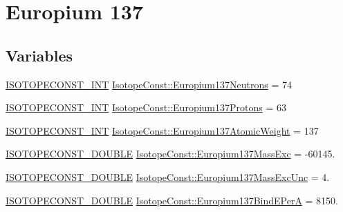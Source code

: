 \hypertarget{group___isotope_const-_europium-_eu137}{}\section{Europium 137}
\label{group___isotope_const-_europium-_eu137}
\subsection*{Variables}
\begin{DoxyCompactItemize}
\item 
\mbox{\hyperlink{group___isotope_const-_macros_ga5f18360b3e99483a35c32d789e62621c}{I\+S\+O\+T\+O\+P\+E\+C\+O\+N\+S\+T\+\_\+\+I\+NT}} \mbox{\hyperlink{group___isotope_const-_europium-_eu137_ga3bf3a65c2ce066a81f9a42bc2dbd182c}{Isotope\+Const\+::\+Europium137\+Neutrons}} = 74
\item 
\mbox{\hyperlink{group___isotope_const-_macros_ga5f18360b3e99483a35c32d789e62621c}{I\+S\+O\+T\+O\+P\+E\+C\+O\+N\+S\+T\+\_\+\+I\+NT}} \mbox{\hyperlink{group___isotope_const-_europium-_eu137_gaedb7fe45412288f79dfe4a004ee0554c}{Isotope\+Const\+::\+Europium137\+Protons}} = 63
\item 
\mbox{\hyperlink{group___isotope_const-_macros_ga5f18360b3e99483a35c32d789e62621c}{I\+S\+O\+T\+O\+P\+E\+C\+O\+N\+S\+T\+\_\+\+I\+NT}} \mbox{\hyperlink{group___isotope_const-_europium-_eu137_gaba948a6826d3500e82c89b603956ab9e}{Isotope\+Const\+::\+Europium137\+Atomic\+Weight}} = 137
\item 
\mbox{\hyperlink{group___isotope_const-_macros_ga8f45a7272ce02c0b4c65c44636ed719a}{I\+S\+O\+T\+O\+P\+E\+C\+O\+N\+S\+T\+\_\+\+D\+O\+U\+B\+LE}} \mbox{\hyperlink{group___isotope_const-_europium-_eu137_ga4af0d256ae4bd2c61c770f03ca2e2f70}{Isotope\+Const\+::\+Europium137\+Mass\+Exc}} = -\/60145.
\item 
\mbox{\hyperlink{group___isotope_const-_macros_ga8f45a7272ce02c0b4c65c44636ed719a}{I\+S\+O\+T\+O\+P\+E\+C\+O\+N\+S\+T\+\_\+\+D\+O\+U\+B\+LE}} \mbox{\hyperlink{group___isotope_const-_europium-_eu137_gaf161e090e45e273acebfafbb9cbd45c9}{Isotope\+Const\+::\+Europium137\+Mass\+Exc\+Unc}} = 4.
\item 
\mbox{\hyperlink{group___isotope_const-_macros_ga8f45a7272ce02c0b4c65c44636ed719a}{I\+S\+O\+T\+O\+P\+E\+C\+O\+N\+S\+T\+\_\+\+D\+O\+U\+B\+LE}} \mbox{\hyperlink{group___isotope_const-_europium-_eu137_gae3b917b5b98493db9cb1689e964b7c69}{Isotope\+Const\+::\+Europium137\+Bind\+E\+PerA}} = 8150.
\item 

\end{DoxyCompactItemize}
